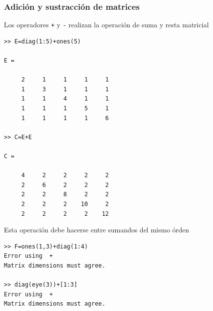 \documentclass[12pt,letterpaper]{article}
\begin{document}
\subsubsection{Adici\'on y sustracci\'on de matrices}
Los operadores \texttt{+} y \texttt{-} realizan la operaci\'on de suma y resta matricial
\begin{multicols}{2}
\begin{verbatim}
>> E=diag(1:5)+ones(5)

E =

     2     1     1     1     1
     1     3     1     1     1
     1     1     4     1     1
     1     1     1     5     1
     1     1     1     1     6
    
>> C=E+E

C =

     4     2     2     2     2
     2     6     2     2     2
     2     2     8     2     2
     2     2     2    10     2
     2     2     2     2    12
     \end{verbatim}
\end{multicols}
Esta operaci\'on debe hacerse entre sumandos del mismo \'orden
\begin{multicols}{2}
\begin{verbatim}
>> F=ones(1,3)+diag(1:4)
Error using  + 
Matrix dimensions must agree.

>> diag(eye(3))+[1:3]
Error using  + 
Matrix dimensions must agree.    
     \end{verbatim}
\end{multicols}
\end{document}
